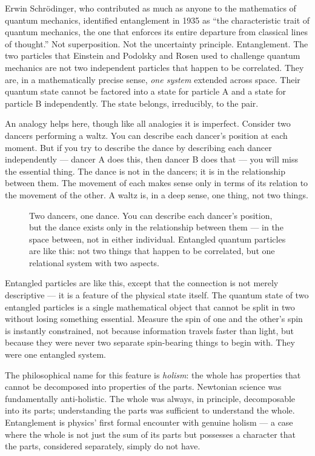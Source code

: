 Erwin Schrödinger, who contributed as much as anyone to the mathematics of quantum mechanics, identified entanglement in 1935 as ``the characteristic trait of quantum mechanics, the one that enforces its entire departure from classical lines of thought.'' Not superposition. Not the uncertainty principle. Entanglement. The two particles that Einstein and Podolsky and Rosen used to challenge quantum mechanics are not two independent particles that happen to be correlated. They are, in a mathematically precise sense, \emph{one system} extended across space. Their quantum state cannot be factored into a state for particle A and a state for particle B independently. The state belongs, irreducibly, to the pair.

An analogy helps here, though like all analogies it is imperfect. Consider two dancers performing a waltz. You can describe each dancer's position at each moment. But if you try to describe the dance by describing each dancer independently --- dancer A does this, then dancer B does that --- you will miss the essential thing. The dance is not in the dancers; it is in the relationship between them. The movement of each makes sense only in terms of its relation to the movement of the other. A waltz is, in a deep sense, one thing, not two things.

\begin{figure}[htbp]
  \centering
  \resizebox{0.60\linewidth}{!}{}
  \caption[The dance is not in the dancers]{Two dancers, one dance. You can describe each dancer's position, but the dance exists only in the relationship between them --- in the space between, not in either individual. Entangled quantum particles are like this: not two things that happen to be correlated, but one relational system with two aspects.}
  \label{fig:waltz-dancers}
\end{figure}

Entangled particles are like this, except that the connection is not merely descriptive --- it is a feature of the physical state itself. The quantum state of two entangled particles is a single mathematical object that cannot be split in two without losing something essential. Measure the spin of one and the other's spin is instantly constrained, not because information travels faster than light, but because they were never two separate spin-bearing things to begin with. They were one entangled system.

The philosophical name for this feature is \emph{holism}: the whole has properties that cannot be decomposed into properties of the parts. Newtonian science was fundamentally anti-holistic. The whole was always, in principle, decomposable into its parts; understanding the parts was sufficient to understand the whole. Entanglement is physics' first formal encounter with genuine holism --- a case where the whole is not just the sum of its parts but possesses a character that the parts, considered separately, simply do not have.

